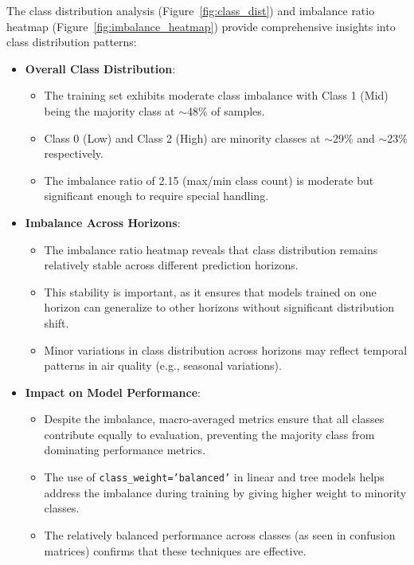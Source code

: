 \documentclass[12pt,a4paper]{article}
\begin{document}
The class distribution analysis (Figure~\ref{fig:class_dist}) and imbalance ratio heatmap (Figure~\ref{fig:imbalance_heatmap}) provide comprehensive insights into class distribution patterns:

\begin{itemize}
    \item \textbf{Overall Class Distribution}:
    \begin{itemize}
        \item The training set exhibits moderate class imbalance with Class 1 (Mid) being the majority class at $\sim$48\% of samples.
        \item Class 0 (Low) and Class 2 (High) are minority classes at $\sim$29\% and $\sim$23\% respectively.
        \item The imbalance ratio of 2.15 (max/min class count) is moderate but significant enough to require special handling.
    \end{itemize}
    
    \item \textbf{Imbalance Across Horizons}:
    \begin{itemize}
        \item The imbalance ratio heatmap reveals that class distribution remains relatively stable across different prediction horizons.
        \item This stability is important, as it ensures that models trained on one horizon can generalize to other horizons without significant distribution shift.
        \item Minor variations in class distribution across horizons may reflect temporal patterns in air quality (e.g., seasonal variations).
    \end{itemize}
    
    \item \textbf{Impact on Model Performance}:
    \begin{itemize}
        \item Despite the imbalance, macro-averaged metrics ensure that all classes contribute equally to evaluation, preventing the majority class from dominating performance metrics.
        \item The use of \texttt{class\_weight='balanced'} in linear and tree models helps address the imbalance during training by giving higher weight to minority classes.
        \item The relatively balanced performance across classes (as seen in confusion matrices) confirms that these techniques are effective.
    \end{itemize}
    

\end{itemize}
\end{document}
